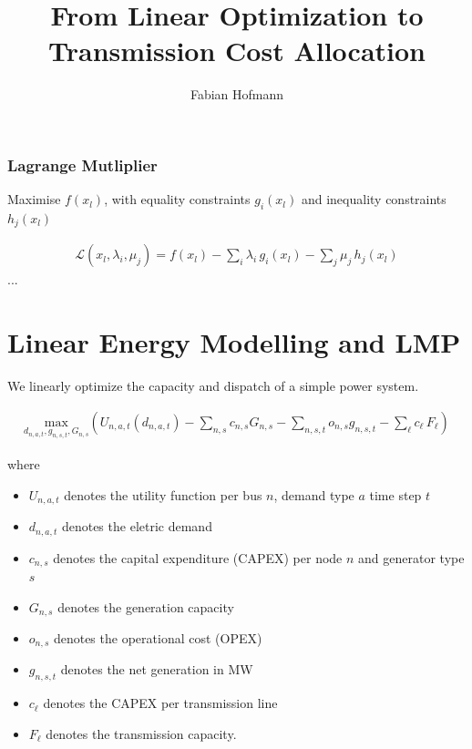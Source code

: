 \documentclass[11pt]{article}
\newcommand{\generation}[1][n]{g_{#1,s,t}}
\newcommand{\capacityGeneration}{G_{n,s}}
\newcommand{\capacityFlow}{F_{\ell}}
\newcommand{\capexGeneration}{c_{n,s}}
\newcommand{\capexFlow}{c_{\ell}}
\newcommand{\opexGeneration}[1][n]{o_{#1,s}}
\newcommand{\demand}[1][n]{d_{#1,a,t}}
\newcommand{\utility}{U_{n,a,t}}
\begin{document}
\title{From Linear Optimization to Transmission Cost Allocation}
\author{Fabian Hofmann}

\maketitle



\subsubsection*{Lagrange Mutliplier}

Maximise $f(x_l)$, with equality constraints $g_i(x_l)$ and inequality constraints $h_j(x_l)$

\begin{align}
 \mathcal {L}(x_l,\lambda_i, \mu_j)=f(x_l)-\sum_i \lambda_i \, g_i(x_l) - \sum_j \mu_j \, h_j(x_l)
\end{align}
...


\section*{Linear Energy Modelling and LMP}



We linearly optimize the capacity and dispatch of a simple power system. 

\begin{align}
    \underset{\demand, \generation, \capacityGeneration}{\text{max}}
    \left(\utility(\demand) - \sum_{n,s} \capexGeneration \capacityGeneration - \sum_{n, s, t} \opexGeneration \generation - \sum_{\ell} \capexFlow \, \capacityFlow \right) \label{eq:minisation}
\end{align}

where 
\begin{itemize}
\item[] $\utility$ denotes the utility function per bus $n$, demand type $a$ time step $t$ 
 \item[] $\demand$ denotes the eletric demand 
 \item[] $\capexGeneration$ denotes the capital expenditure (CAPEX) per node $n$ and generator type $s$
 \item[] $\capacityGeneration$ denotes the generation capacity
 \item[] $\opexGeneration$ denotes the operational cost (OPEX)
 \item[] $\generation$ denotes the net generation in MW
 \item[] $\capexFlow$ denotes the CAPEX per transmission line 
 \item[] $\capacityFlow$ denotes the transmission capacity.
\end{itemize}
% 
\end{document}
